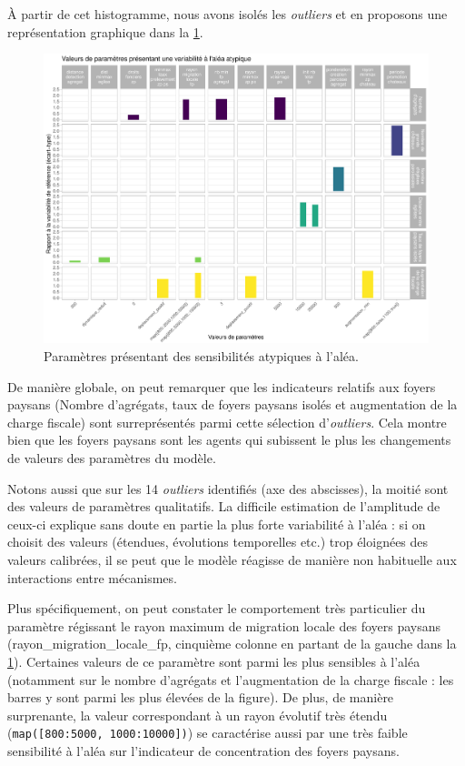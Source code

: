 À partir de cet histogramme, nous avons isolés les \textit{outliers} et en proposons une représentation graphique dans la \cref{fig:sensib-alea}.
\begin{figure}[H]
	\centering
	\includegraphics[width=\linewidth]{img/sensibilite_alea_outliers.pdf}
	\caption{Paramètres présentant des sensibilités atypiques à l'aléa.}
	\label{fig:sensib-alea}
\end{figure}

De manière globale, on peut remarquer que les indicateurs relatifs aux foyers paysans (Nombre d'agrégats, taux de foyers paysans isolés et augmentation de la charge fiscale) sont surreprésentés parmi cette sélection d'\textit{outliers}.
Cela montre bien que les foyers paysans sont les agents qui subissent le plus les changements de valeurs des paramètres du modèle.

Notons aussi que sur les 14 \textit{outliers} identifiés (axe des abscisses), la moitié sont des valeurs de paramètres qualitatifs.
La difficile estimation de l'amplitude de ceux-ci explique sans doute en partie la plus forte variabilité à l'aléa : si on choisit des valeurs (étendues, évolutions temporelles etc.) trop éloignées des valeurs calibrées, il se peut que le modèle réagisse de manière non habituelle aux interactions entre mécanismes.

Plus spécifiquement, on peut constater le comportement très particulier du paramètre régissant le rayon maximum de migration locale des foyers paysans (\textsf{rayon\_migration\_locale\_fp}, cinquième colonne en partant de la gauche dans la \cref{fig:sensib-alea}).
Certaines valeurs de ce paramètre sont parmi les plus sensibles à l'aléa (notamment sur le nombre d'agrégats et l'augmentation de la charge fiscale : les barres y sont parmi les plus élevées de la figure).
De plus, de manière surprenante, la valeur correspondant à un rayon évolutif très étendu (\texttt{map([800:5000, 1000:10000])}) se caractérise aussi par une très faible sensibilité à l'aléa sur l'indicateur de concentration des foyers paysans.

